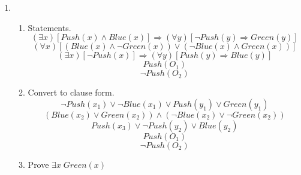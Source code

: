 \documentclass{article}
\begin{document}
\begin{enumerate}
\begin{enumerate}
\end{enumerate}


\item 
	\begin{enumerate}
	\item Statements.
	$$(\exists x)[Push(x) \land Blue(x)] \Rightarrow (\forall y)[\neg Push(y) \Rightarrow Green(y)]$$
	$$(\forall x)[(Blue(x) \land \neg Green(x)) \lor (\neg Blue(x) \land Green(x))]$$
	$$(\exists x)[\neg Push(x)] \Rightarrow (\forall y)[Push(y) \Rightarrow Blue(y)]$$
	$$Push(O_1)$$
	$$\neg Push(O_2)$$


	\item Convert to clause form.
	$$\neg Push(x_1) \lor \neg Blue(x_1) \lor Push(y_1) \lor Green(y_1)$$
	$$(Blue(x_2) \lor Green(x_2)) \land (\neg Blue(x_2) \lor \neg Green(x_2))$$
	$$Push(x_3) \lor \neg Push(y_2) \lor Blue(y_2)$$
	$$Push(O_1)$$
	$$\neg Push(O_2)$$
	


	\item Prove $\exists x \; Green(x)$
	
	\end{enumerate}


\end{enumerate}
\end{document}
